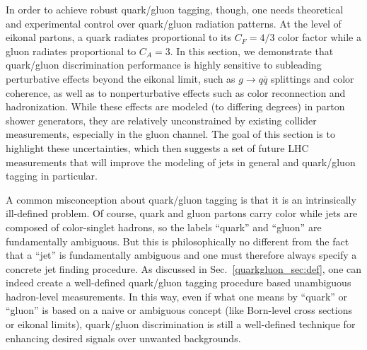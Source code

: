 \documentclass[11pt]{cernrep}
\begin{document}
In order to achieve robust quark/gluon tagging, though, one needs theoretical and experimental control over quark/gluon radiation patterns.  At the level of eikonal partons, a quark radiates proportional to its $C_F = 4/3$ color factor while a gluon radiates proportional to $C_A = 3$.  In this section, we demonstrate that quark/gluon discrimination performance is highly sensitive to subleading perturbative effects beyond the eikonal limit, such as $g \to q \overline{q}$ splittings and color coherence, as well as to nonperturbative effects such as color reconnection and hadronization.   While these effects are modeled (to differing degrees) in parton shower generators, they are relatively unconstrained by existing collider measurements, especially in the gluon channel.  The goal of this section is to highlight these uncertainties, which then suggests a set of future LHC measurements that will improve the modeling of jets in general and quark/gluon tagging in particular.

A common misconception about quark/gluon tagging is that it is an intrinsically ill-defined problem.  Of course, quark and gluon partons carry color while jets are composed of color-singlet hadrons, so the labels ``quark'' and ``gluon'' are fundamentally ambiguous. 
But this is philosophically no different from the fact that a ``jet'' is fundamentally ambiguous and one must therefore always specify a concrete jet finding procedure.  As discussed in Sec.~\ref{quarkgluon_sec:def}, one can indeed create a well-defined quark/gluon tagging procedure based unambiguous hadron-level measurements.  In this way, even if what one means by ``quark'' or ``gluon'' is based on a naive or ambiguous concept (like Born-level cross sections or eikonal limits), quark/gluon discrimination is still a well-defined technique for enhancing desired signals over unwanted backgrounds.
  
\end{document}
